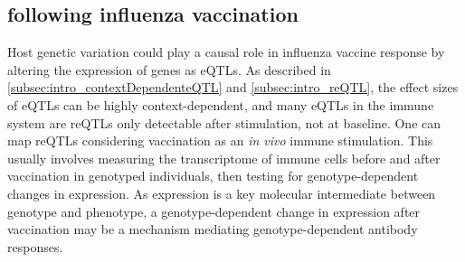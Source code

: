 
\subsection{ following influenza vaccination}
\label{subsec:hird_reQTL_following_influenza_vaccination}

Host genetic variation could play a causal role in influenza vaccine response by altering the expression of genes as \glspl{eQTL}.
As described in \cref{subsec:intro_contextDependenteQTL} and \cref{subsec:intro_reQTL}, the effect sizes of \glspl{eQTL} can be highly context-dependent,
and many \glspl{eQTL} in the immune system are \glspl{reQTL} only detectable after stimulation, not at baseline.
One can map \glspl{reQTL} considering vaccination as an \textit{in vivo} immune stimulation.
This usually involves measuring the transcriptome of immune cells before and after vaccination in genotyped individuals,
then testing for genotype-dependent changes in expression.
As expression is a key molecular intermediate between genotype and phenotype,
a genotype-dependent change in expression after vaccination may be a mechanism mediating genotype-dependent antibody responses.

